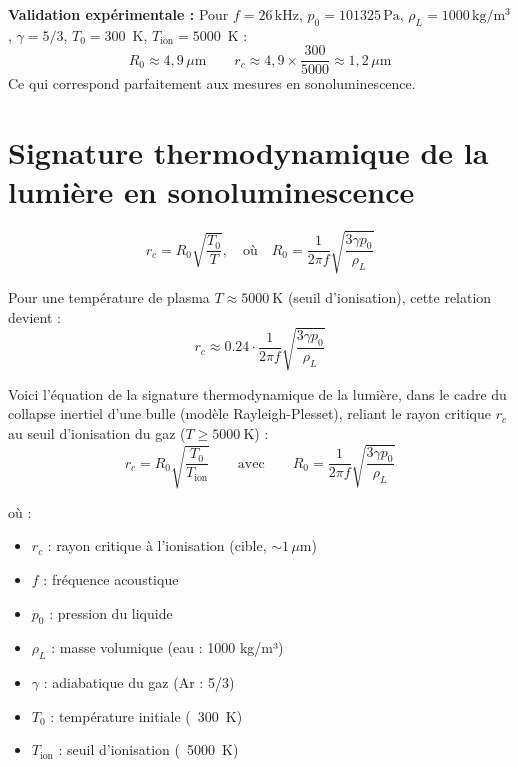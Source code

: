 \documentclass[a4paper,12pt]{article}
\begin{document}
\bigskip

\textbf{Validation expérimentale :}
Pour $f=26\,\text{kHz}$, $p_0=101325\,\text{Pa}$, $\rho_L=1000\,\text{kg}/\text{m}^3$, $\gamma=5/3$, $T_0=300$~K, $T_\text{ion}=5000$~K :
\[
R_0 \approx 4{,}9\,\mu\text{m} \qquad
r_c \approx 4{,}9 \times \frac{300}{5000} \approx 1{,}2\,\mu\text{m}
\]
Ce qui correspond parfaitement aux mesures en sonoluminescence.

\section{Signature thermodynamique de la lumière en sonoluminescence}

\begin{equation}
\boxed{
r_c = R_0 \sqrt{\frac{T_0}{T}}, \quad \text{où} \quad R_0 = \frac{1}{2\pi f} \sqrt{\frac{3\gamma p_0}{\rho_L}}
}
\end{equation}
\label{eq:rc-rayleigh-plesset}

Pour une température de plasma \( T \approx \SI{5000}{\kelvin} \) (seuil d'ionisation), cette relation devient :
\begin{equation}
\boxed{
r_c \approx 0.24 \cdot \frac{1}{2\pi f} \sqrt{\frac{3\gamma p_0}{\rho_L}}
}
\end{equation}
\label{eq:rc-numerique}

Voici l'équation de la signature thermodynamique de la lumière, dans le cadre du collapse inertiel d'une bulle (modèle Rayleigh-Plesset), reliant le rayon critique $r_c$ au seuil d'ionisation du gaz ($T \geq \SI{5000}{\kelvin}$) :
\begin{equation}
r_c = R_0 \sqrt{\frac{T_0}{T_\text{ion}}}
\qquad\text{avec}\qquad
R_0 = \frac{1}{2 \pi f} \sqrt{\frac{3\gamma p_0}{\rho_L}}
\end{equation}

où :
\begin{itemize}
    \item $r_c$ : rayon critique à l'ionisation (cible, $\sim 1\,\mu\text{m}$)
    \item $f$ : fréquence acoustique
    \item $p_0$ : pression du liquide
    \item $\rho_L$ : masse volumique (eau : 1000 kg/m³)
    \item $\gamma$ : adiabatique du gaz (Ar : 5/3)
    \item $T_0$ : température initiale (~300~K)
    \item $T_\text{ion}$ : seuil d'ionisation (~5000~K)
\end{itemize}
\end{document}
